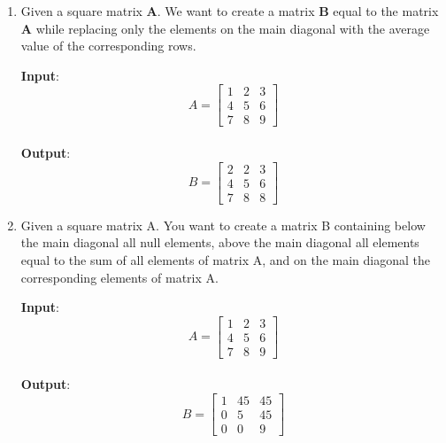 \documentclass[oneside]{article}
\begin{document}
\begin{enumerate}
	\item
	      Given a square matrix \textbf{A}. We want to create a matrix \textbf{B} equal to the matrix \textbf{A} while replacing only the elements on the main diagonal with the average value of the corresponding rows.
	      \begin{tcolorbox}[blanker, breakable, left=5mm, before skip=10pt, after skip=10pt, borderline west={1mm}{0pt}{primarycolor}]
		      \textbf{Input}: \begin{equation*}
			      A = \begin{bmatrix}
				      1 & 2 & 3 \\
				      4 & 5 & 6 \\
				      7 & 8 & 9
			      \end{bmatrix}
		      \end{equation*}\\
		      \textbf{Output}: \begin{equation*}
			      B = \begin{bmatrix}
				      2 & 2 & 3 \\
				      4 & 5 & 6 \\
				      7 & 8 & 8
			      \end{bmatrix}
		      \end{equation*}
	      \end{tcolorbox}

	\item
	      Given a square matrix A. You want to create a matrix B containing below the main diagonal all null elements, above the main diagonal all elements equal to the sum of all elements of matrix A, and on the main diagonal the corresponding elements of matrix A.
	      \begin{tcolorbox}[blanker, breakable, left=5mm, before skip=10pt, after skip=10pt, borderline west={1mm}{0pt}{primarycolor}]
		      \textbf{Input}: \begin{equation*}
			      A = \begin{bmatrix}
				      1 & 2 & 3 \\
				      4 & 5 & 6 \\
				      7 & 8 & 9
			      \end{bmatrix}
		      \end{equation*}\\
		      \textbf{Output}: \begin{equation*}
			      B = \begin{bmatrix}
				      1 & 45 & 45 \\
				      0 & 5  & 45 \\
				      0 & 0  & 9
			      \end{bmatrix}
		      \end{equation*}
	      \end{tcolorbox}


\end{enumerate}
\end{document}
